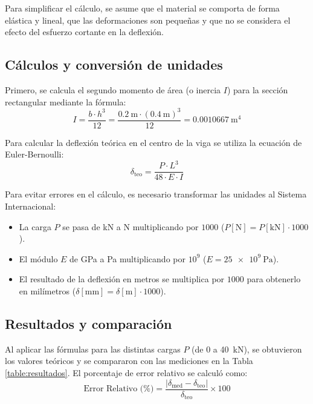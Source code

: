 Para simplificar el cálculo, se asume que el material se comporta de forma elástica y lineal, que las deformaciones son pequeñas y que no se considera el efecto del esfuerzo cortante en la deflexión.

\subsection{Cálculos y conversión de unidades}
Primero, se calcula el segundo momento de área (o inercia $I$) para la sección rectangular mediante la fórmula:
\begin{equation}
I = \frac{b \cdot h^3}{12} = \frac{\SI{0.2}{\meter} \cdot (\SI{0.4}{\meter})^3}{12} = \SI{0.0010667}{\meter\tothe{4}}
\end{equation}

Para calcular la deflexión teórica en el centro de la viga se utiliza la ecuación de Euler-Bernoulli:
\begin{equation}
\delta_{\text{teo}} = \frac{P \cdot L^3}{48 \cdot E \cdot I}
\end{equation}

Para evitar errores en el cálculo, es necesario transformar las unidades al Sistema Internacional:
\begin{itemize}
    \item La carga $P$ se pasa de \si{\kilo\newton} a \si{\newton} multiplicando por $1000$ ($P [\text{N}] = P [\text{kN}] \cdot 1000$).
    \item El módulo $E$ de \si{\giga\pascal} a \si{\pascal} multiplicando por $10^9$ ($E = \SI{25e9}{\pascal}$).
    \item El resultado de la deflexión en metros se multiplica por $1000$ para obtenerlo en milímetros ($\delta [\text{mm}] = \delta [\text{m}] \cdot 1000$).
\end{itemize}

\subsection{Resultados y comparación}
Al aplicar las fórmulas para las distintas cargas $P$ (de 0 a \SI{40}{\kilo\newton}), se obtuvieron los valores teóricos y se compararon con las mediciones en la Tabla \ref{table:resultados}. El porcentaje de error relativo se calculó como:
\begin{equation}
\text{Error Relativo (\%)} = \frac{|\delta_{\text{med}} - \delta_{\text{teo}}|}{\delta_{\text{teo}}} \times 100
\end{equation}

